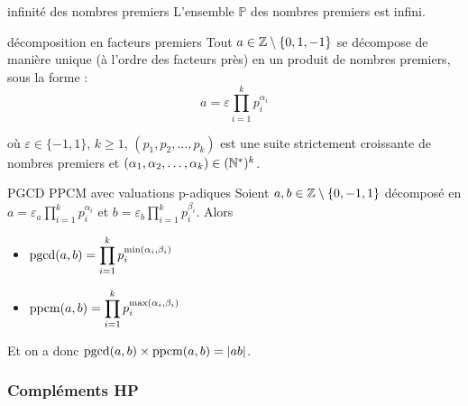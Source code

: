 \begin{proposition}{infinité des nombres premiers}{}
    L'ensemble $\mathbb{P}$ des nombres premiers est infini.
\end{proposition}

\begin{theoreme}{décomposition en facteurs premiers}{}
    Tout $a \in \mathbb{Z} \setminus \{0, 1, -1\}$ se décompose de manière unique (à l'ordre des facteurs près) en un produit
    de nombres premiers, sous la forme : 
    \[
        a = \varepsilon \prod_{i = 1}^k p_i^{\alpha_i} 
    \]

    où $\varepsilon \in \{-1, 1\}$, $k \geqslant 1$, $(p_1, p_2, \ldots, p_k)$ est une suite strictement croissante de nombres premiers
    et $(\alpha_1, \alpha_2, \ldots, \alpha_k) \in (\mathbb{N}^*)^k$.
    
\end{theoreme}


\lvspace \avspace \begin{proposition}{PGCD PPCM avec valuations p-adiques}{}
    Soient $a, b \in \mathbb{Z} \setminus \{0, -1, 1\}$ décomposé en 
    $\displaystyle a = \varepsilon_a \prod_{i = 1}^k p_i^{\alpha_i}$ et
    $\displaystyle b = \varepsilon_b \prod_{i = 1}^k p_i^{\beta_i}$. 
    Alors 
    
    \begin{itemize}
        \item $\displaystyle \operatorname{pgcd}(a, b) = \prod_{i = 1}^k p_i^{\min(\alpha_i, \beta_i)}$
        \item $\displaystyle \operatorname{ppcm}(a, b) = \prod_{i = 1}^k p_i^{\max(\alpha_i, \beta_i)}$
    \end{itemize} 
    
    Et on a donc $\displaystyle \operatorname{pgcd}(a, b) \times \operatorname{ppcm}(a, b) = |ab|$.
\end{proposition}

\subsubsection{Compléments HP}

